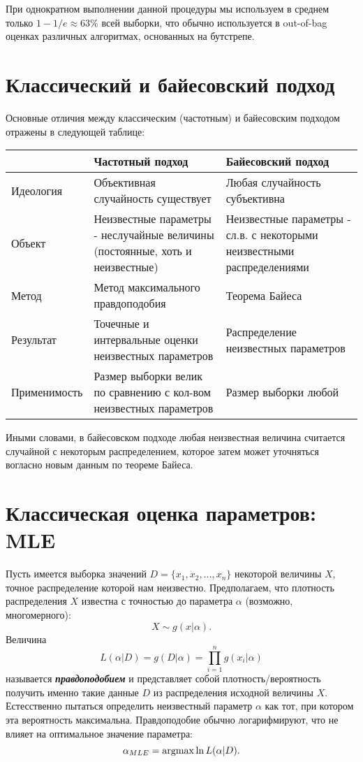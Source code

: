 При однократном выполнении данной процедуры мы используем в среднем только $1 - 1/e \approx 63\%$ всей выборки, что обычно используется в out-of-bag оценках различных алгоритмах, основанных на бутстрепе.


\section{Классический и байесовский подход}

Основные отличия между классическим (частотным) и байесовским подходом отражены в следующей таблице:

\begin{tabular}{ p{3cm}|p{6cm}|p{5cm} }
          & Частотный подход & Байесовский подход \\ \hline 
Идеология & Объективная случайность существует & Любая случайность субъективна \\
Объект    & Неизвестные параметры - неслучайные величины (постоянные, хоть и неизвестные) & Неизвестные параметры -  сл.в. с некоторыми неизвестными распределениями \\
Метод     & Метод максимального правдоподобия & Теорема Байеса \\
Результат & Точечные и интервальные оценки неизвестных параметров & Распределение неизвестных параметров \\
Применимость & Размер выборки велик по сравнению с кол-вом неизвестных параметров & Размер выборки любой \\ \hline
\end{tabular}

Иными словами, в байесовском подходе любая неизвестная величина считается случайной с некоторым распределением, которое затем может уточняться вогласно новым данным по теореме Байеса. 

\section{Классическая оценка параметров: MLE}

Пусть имеется выборка значений $D = \{x_1, x_2, ..., x_n\}$ некоторой величины $X$, точное распределение которой нам неизвестно. Предполагаем, что плотность распределения $X$ известна с точностью до параметра $\alpha$ (возможно, многомерного): 
$$
X \sim g(x | \alpha).
$$
Величина
$$
L(\alpha|D) = g(D | \alpha) = \prod_{i=1}^n g(x_i | \alpha)
$$
называется \textbf{\textit{правдоподобием}} и представляет собой плотность/вероятность получить именно такие данные $D$ из распределения исходной величины $X$. Естесственно пытаться определить неизвестный параметр $\alpha$ как тот, при котором эта вероятность максимальна. Правдоподобие обычно логарифмируют, что не влияет на оптимальное значение параметра:
$$
\alpha_{MLE} = \operatorname*{argmax}{\ln{L(\alpha|D)}}.
$$


